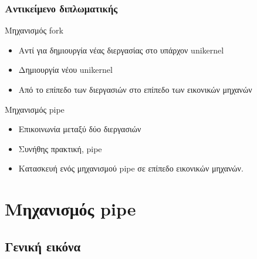 \documentclass[red,slidestop,notes,compress,mathserif]{beamer}
\begin{document}
\begin{frame}
\frametitle{Αντικείμενο διπλωματικής}
\begin{block}{Μηχανισμός fork}
\begin{itemize}
\item Αντί για δημιουργία νέας διεργασίας στο υπάρχον unikernel
\item Δημιουργία νέου unikernel
\item Από το επίπεδο των διεργασιών στο επίπεδο των εικονικών μηχανών
\end{itemize}
\end{block}
\begin{block}{Μηχανισμός pipe}
\begin{itemize}
\item Επικοινωνία μεταξύ δύο διεργασιών
\item Συνήθης πρακτική, pipe
\item Κατασκευή ενός μηχανισμού pipe σε επίπεδο εικονικών μηχανών. 
\end{itemize}
\end{block}
\end{frame}

\section{Μηχανισμός pipe}
\subsection{Γενική εικόνα}

\end{document}
